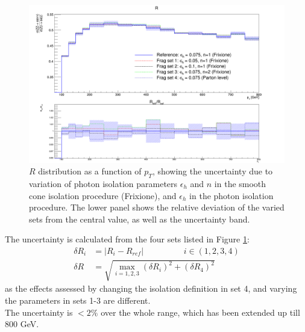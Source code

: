 \documentclass[11pt,a4paper]{report}
\begin{document}
\begin{figure}[H]
\centering
	\includegraphics[width=\textwidth]{frag.png}
	\caption{$R$ distribution as a function of $p_T$, showing the uncertainty due to variation of photon isolation parameters $\epsilon_h$ and $n$ in the smooth cone isolation procedure (Frixione), and $\epsilon_h$ in the photon isolation procedure. The lower panel shows the relative deviation of the varied sets from the central value, as well as the uncertainty band.}
	\label{fig:photon_frag}
\end{figure}

The uncertainty is calculated from the four sets listed in Figure \ref{fig:photon_frag}:
\begin{equation}
\begin{split}
\delta R_i &= |R_i - R_{ref}| \hspace{2cm}  i \in (1,2,3,4)\\
\delta R &= \sqrt{\max_{i=1,2,3}(\delta R_i)^2 + (\delta R_4)^2}
\end{split}
\end{equation}
as the effects assessed by changing the isolation definition in set 4, and varying the parameters in sets 1-3 are different.\\
The uncertainty is $< 2\%$ over the whole range, which has been extended up till 800 GeV.
\end{document}
